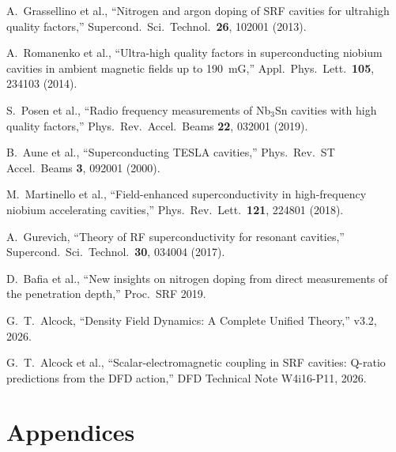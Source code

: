 \documentclass[11pt]{article}
\begin{document}
\begin{enumerate}[label={[\arabic*]}, nosep]
\item A.~Grassellino et al., ``Nitrogen and argon doping of SRF
  cavities for ultrahigh quality factors,'' Supercond.\ Sci.\ Technol.\
  \textbf{26}, 102001 (2013).

\item A.~Romanenko et al., ``Ultra-high quality factors in
  superconducting niobium cavities in ambient magnetic fields up to
  190~mG,'' Appl.\ Phys.\ Lett.\ \textbf{105}, 234103 (2014).

\item S.~Posen et al., ``Radio frequency measurements of Nb$_3$Sn
  cavities with high quality factors,'' Phys.\ Rev.\ Accel.\ Beams
  \textbf{22}, 032001 (2019).

\item B.~Aune et al., ``Superconducting TESLA cavities,'' Phys.\ Rev.\
  ST Accel.\ Beams \textbf{3}, 092001 (2000).

\item M.~Martinello et al., ``Field-enhanced superconductivity in
  high-frequency niobium accelerating cavities,'' Phys.\ Rev.\ Lett.\
  \textbf{121}, 224801 (2018).

\item A.~Gurevich, ``Theory of RF superconductivity for resonant
  cavities,'' Supercond.\ Sci.\ Technol.\ \textbf{30}, 034004 (2017).

\item D.~Bafia et al., ``New insights on nitrogen doping from direct
  measurements of the penetration depth,'' Proc.\ SRF 2019.

\item G.~T.~Alcock, ``Density Field Dynamics: A Complete Unified Theory,''
  v3.2, 2026.

\item G.~T.~Alcock et al., ``Scalar-electromagnetic coupling in SRF
  cavities: Q-ratio predictions from the DFD action,'' DFD Technical
  Note W4i16-P11, 2026.
\end{enumerate}


\part{Appendices}
\end{document}
